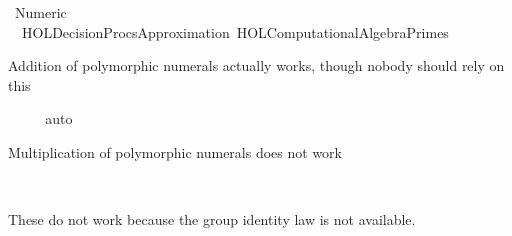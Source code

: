 %
\begin{isabellebody}%
%
%
\isadelimdocument
%
\endisadelimdocument
%
\isatagdocument
%
\isamarkuptrue%
%
\endisatagdocument
{\isafolddocument}%
%
\isadelimdocument
%
\endisadelimdocument
%
\isadelimtheory
%
\endisadelimtheory
%
\isatagtheory
{}\isamarkupfalse%
\ Numeric\ \isanewline
\ \ {\isachardoublequoteopen}HOL{\isacharminus}{\kern0pt}Decision{\isacharunderscore}{\kern0pt}Procs{\isachardot}{\kern0pt}Approximation{\isachardoublequoteclose}\ {\isachardoublequoteopen}HOL{\isacharminus}{\kern0pt}Computational{\isacharunderscore}{\kern0pt}Algebra{\isachardot}{\kern0pt}Primes{\isachardoublequoteclose}\isanewline
\ \ \ \isanewline
{}%
\endisatagtheory
{\isafoldtheory}%
%
\isadelimtheory
%
\endisadelimtheory
%
\begin{isamarkuptext}%
Addition of polymorphic numerals actually works, 
though nobody should rely on this%
\end{isamarkuptext}\isamarkuptrue%
\isamarkupfalse%
\ {\isachardoublequoteopen}{}{\isacharplus}{\kern0pt}{}{\isacharequal}{\kern0pt}{}{\isachardoublequoteclose}\isanewline
%
\isadelimproof
\ \ %
\endisadelimproof
%
\isatagproof
{}\isamarkupfalse%
\ auto%
\endisatagproof
{\isafoldproof}%
%
\isadelimproof
%
\endisadelimproof
%
\begin{isamarkuptext}%
Multiplication of polymorphic numerals does not work%
\end{isamarkuptext}\isamarkuptrue%
\isamarkupfalse%
\ {\isachardoublequoteopen}{}{\isacharasterisk}{\kern0pt}{}{\isacharequal}{\kern0pt}{}{\isachardoublequoteclose}\isanewline
%
\isadelimproof
\ \ %
\endisadelimproof
%
\isatagproof
{}\isamarkupfalse%
%
\endisatagproof
{\isafoldproof}%
%
\isadelimproof
%
\endisadelimproof
%
\begin{isamarkuptext}%
These do not work because the group identity law is not available.%
\end{isamarkuptext}\isamarkuptrue%
\isamarkupfalse%
\ {\isachardoublequoteopen}{}{\isacharplus}{\kern0pt}{}{\isacharequal}{\kern0pt}{}{\isachardoublequoteclose}\ {\isachardoublequoteopen}{}{\isacharasterisk}{\kern0pt}{}{\isacharequal}{\kern0pt}{}{\isachardoublequoteclose}\isanewline
%
\isadelimproof

\end{isabellebody}
